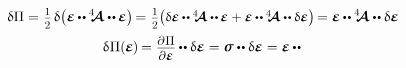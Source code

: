 \nopagebreak\vspace{.1em}\begin{equation*}
\begin{gathered}
\variation{\potential}
= \hspace{.1ex}
\smash{\smalldisplaystyleonehalf} \hspace{.25ex}
\variation{ \bigl(
   \infinitesimaldeformation
   \hspace{-0.1ex} \dotdotp \hspace{-0.1ex}
   \stiffnesstensor
   \dotdotp \hspace{-0.1ex}
   \infinitesimaldeformation
\bigr)
} \hspace{-0.25ex}
= \hspace{.1ex}
\smash{\smalldisplaystyleonehalf}
\hspace{-0.1ex} \bigl(
\scalebox{.95}{$
   \variation{\infinitesimaldeformation}
   \hspace{-0.1ex} \dotdotp \hspace{-0.1ex}
   \stiffnesstensor
   \dotdotp \hspace{-0.1ex}
   \infinitesimaldeformation
   +
   \infinitesimaldeformation
   \hspace{-0.1ex} \dotdotp \hspace{-0.1ex}
   \stiffnesstensor
   \dotdotp
   \variation{\infinitesimaldeformation}
$}
\bigr)
\hspace{-0.25ex} =
\tikzmark{beginLinearStressAsDeformationAndStiffness}
\infinitesimaldeformation
\hspace{-0.1ex} \dotdotp \hspace{-0.1ex}
\stiffnesstensor
\tikzmark{endLinearStressAsDeformationAndStiffness}
\dotdotp
\variation{\infinitesimaldeformation}
\\[.3em]
%
\variation{\hspace{.1ex}\potential}
( \hspace{-0.1ex}
    \infinitesimaldeformation
\hspace{-0.1ex} ) \hspace{-0.2ex}
= \scalebox{.9}{$
    \displaystyle\frac{
        \raisemath{-0.16em}
        {\partial \hspace{.1ex} \potential}}
        {\partial \infinitesimaldeformation}
    $} \hspace{-0.1ex}
\dotdotp
\variation{\infinitesimaldeformation}
= \linearstress
\dotdotp
\variation{\infinitesimaldeformation}
= \infinitesimaldeformation
\hspace{-0.1ex} \dotdotp \hspace{-0.1ex}

\end{gathered}
\end{equation*}
